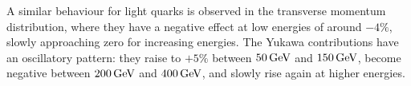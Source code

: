 A similar behaviour for light quarks is observed in the transverse momentum distribution, where they have a negative effect at low energies of around $-4\%$, slowly approaching zero for increasing energies. The Yukawa contributions have an oscillatory pattern: they raise to $+5\%$ between $50\,\textup{GeV}$ and $150\,\textup{GeV}$, become negative between $200\,\textup{GeV}$ and $400\,\textup{GeV}$, and slowly rise again at higher energies.


